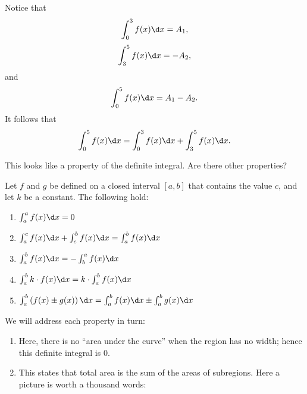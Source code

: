 \documentclass{ximera}
\begin{document}
Notice that 
\[
 \int_0^3 f(x) \d x= A_1,
 \]
 \[
 \int_3^5 f(x) \d x=-A_2,
 \]
and
\[
\int_0^5 f(x) \d x=A_1-A_2.
\]
It follows that
 \[
\int_0^5 f(x) \d x= \int_0^3 f(x) \d x+ \int_3^5 f(x) \d x.
\]

This looks like a property of the definite integral. Are there other properties?

\begin{theorem}
Let $f$ and $g$ be defined on a closed interval $[a,b]$ that contains the
value $c$, and let $k$ be a constant. The following
hold:
\begin{enumerate}
\item $\int_a^a f(x)\d x = 0$
\item $\int_a^c f(x)\d x + \int_c^b f(x)\d x = \int_a^b f(x)\d x$
\item $\int_a^bf(x)\d x = -\int_b^a f(x)\d x$
\item $\int_a^bk\cdot f(x)\d x = k\cdot\int_a^bf(x)\d x$
\item $\int_a^b \left(f(x)\pm g(x)\right)\d x = \int_a^bf(x)\d x \pm \int_a^bg(x)\d x$
\end{enumerate}
\begin{explanation}
  We will address each property in turn:
\begin{enumerate}
\item Here, there is no ``area under the curve'' when the region has
  no width; hence this definite integral is $0$.
\item This states that total area is the sum of the areas of
  subregions. Here a picture is worth a thousand words:
  \begin{image}
\end{image}
\end{enumerate}
\end{explanation}
\end{theorem}
\end{document}

